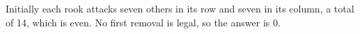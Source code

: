 Initially each rook attacks seven others in its row and seven in its column, a total of 14, which is even. No first removal is legal, so the answer is $\boxed0$.
